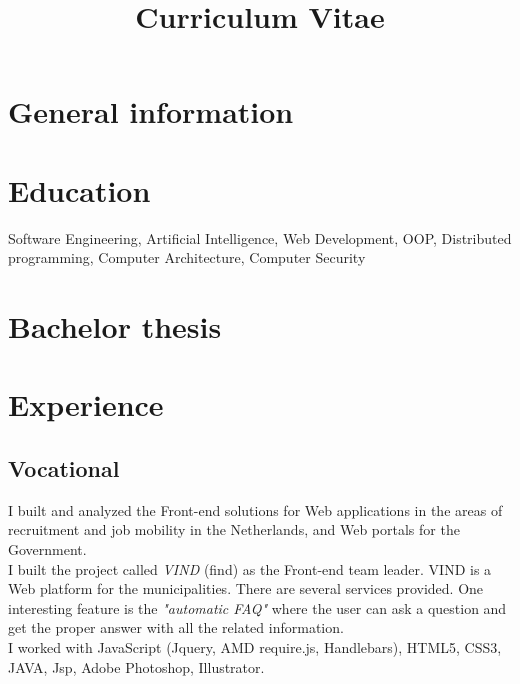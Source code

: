 \documentclass[11pt,a4paper]{moderncv-mod}
\title{Curriculum Vitae}               %
\begin{document}
\maketitle

\section{General information}

\section{Education}
{Software Engineering, Artificial Intelligence, Web Development, OOP, Distributed programming, Computer Architecture, Computer Security}  %
\newline


\section{Bachelor thesis}

\section{Experience}
\subsection{Vocational}

{I built and analyzed the Front-end solutions for Web applications in the areas of recruitment and job mobility in the Netherlands, and Web portals for the Government.\\
I built the project called \emph{VIND} (find) as the Front-end team leader. VIND is a Web platform for the municipalities. There are several services provided. One interesting feature is the \emph{"automatic FAQ"} where the user can ask a question and get the proper answer with all the related information.\\ 
I worked with JavaScript (Jquery, AMD require.js, Handlebars), HTML5, CSS3, JAVA, Jsp, Adobe Photoshop, Illustrator.}
\end{document}
